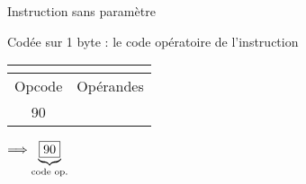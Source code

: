 \documentclass[14pt,xcolor,table]{beamer}
\begin{document}
\begin{frame}[fragile]{Instruction sans paramètre}

	Codée sur 1 byte : le code opératoire de l'instruction
	\begin{center}
		\emph{}
	\end{center}

	\bigskip 

	\begin{center}
	\begin{footnotesize}
	\begin{tabular}{|c|c|}
		\multicolumn{2}{c}{\asm{NOP}}\\\hline
		{\cellcolor{gray!25}Opcode} & {\cellcolor{gray!25}Opérandes} \\\hline
		90 & \\\hline
	\end{tabular}
	\end{footnotesize}
	\end{center}

	\begin{center}
		 $\Longrightarrow \underbrace{\fbox{90}}_{\text{code op.}}$ 
	\end{center}

\end{frame}
\end{document}
